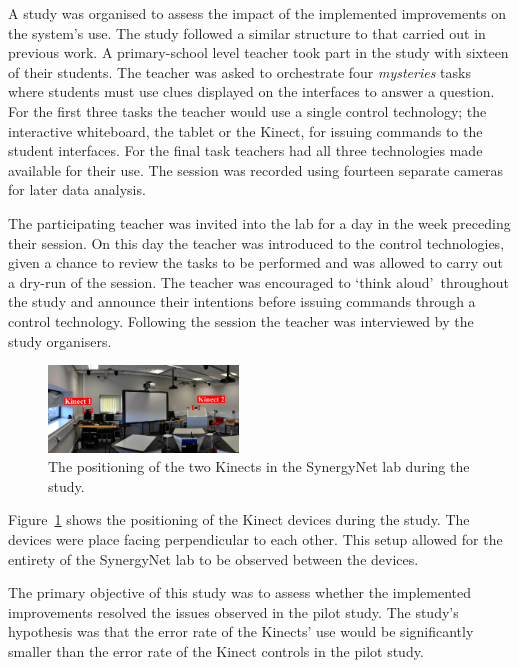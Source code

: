 \documentclass[link]{IWCOMP}
\begin{document}
A study was organised to assess the impact of the implemented improvements on the system's use.
The study followed a similar structure to that carried out in previous work.
A primary-school level teacher took part in the study with sixteen of their students.
The teacher was asked to orchestrate four \textit{mysteries} tasks~\cite{AlAgha2010} where students must use clues displayed on the interfaces to answer a question.
For the first three tasks the teacher would use a single control technology; the interactive whiteboard, the tablet or the Kinect, for issuing commands to the student interfaces.
For the final task teachers had all three technologies made available for their use.
The session was recorded using fourteen separate cameras for later data analysis.

The participating teacher was invited into the lab for a day in the week preceding their session.
On this day the teacher was introduced to the control technologies, given a chance to review the tasks to be performed and was allowed to carry out a dry-run of the session.
The teacher was encouraged to \lq think aloud\rq\ throughout the study and announce their intentions before issuing commands through a control technology.
Following the session the teacher was interviewed by the study organisers.

\begin{figure}[h]
  \centering
  \includegraphics[width=0.45\textwidth]{figures/multiple_kinect_setup.png}
  \caption{The positioning of the two Kinects in the SynergyNet lab during the study.}
  \label{fig:kinectSetup}
\end{figure}

Figure~\ref{fig:kinectSetup} shows the positioning of the Kinect devices during the study.
The devices were place facing perpendicular to each other.
This setup allowed for the entirety of the SynergyNet lab to be observed between the devices.

The primary objective of this study was to assess whether the implemented improvements resolved the issues observed in the pilot study.
The study's hypothesis was that the error rate of the Kinects' use would be significantly smaller than the error rate of the Kinect controls in the pilot study.
\end{document}
